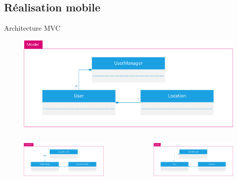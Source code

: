\documentclass{beamer} %
\begin{document}
  \subsection{Réalisation mobile}
  \begin{frame}{\subsecname}
      \begin{center}
        Architecture MVC
        \begin{figure}
        \includegraphics[width=0.58\linewidth, height=\textheight, keepaspectratio]{android-model.png}
        \end{figure}
      \end{center}

      \vspace*{-8mm}

      \begin{columns}
        \begin{column}{0.58\textwidth}
          \begin{figure}
          \includegraphics[width=\linewidth, height=\textheight, keepaspectratio]{android-controller.png}
          \end{figure}
        \end{column}
        \begin{column}{0.58\textwidth}
          \begin{figure}
          \includegraphics[width=\linewidth, height=\textheight, keepaspectratio]{android-model.png}
          \end{figure}
        \end{column}
      \end{columns}


\end{frame}
\end{document}
